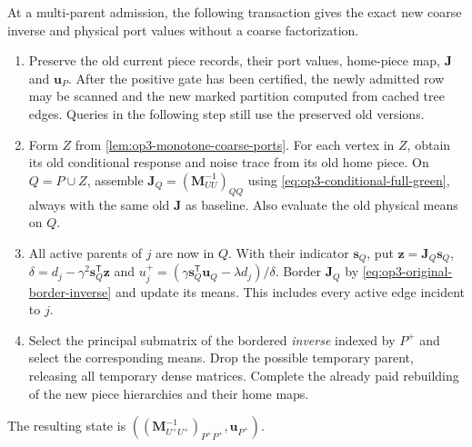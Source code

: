 \begin{lemma}
\label{lem:op3-cycle-inverse-transaction}
At a multi-parent admission, the following transaction gives the exact
new coarse inverse and physical port values without a coarse factorization.
\begin{enumerate}
 \item Preserve the old current piece records, their port values, home-piece
 map, $\boldsymbol J$ and $\boldsymbol u_P$. After the positive gate has
 been certified, the newly admitted row may be scanned and the new marked
 partition computed from cached tree edges. Queries in the following step
 still use the preserved old versions.
 \item Form $Z$ from \cref{lem:op3-monotone-coarse-ports}. For each vertex
 in $Z$, obtain its old conditional response and noise trace from its old
 home piece. On $Q=P\cup Z$, assemble
 $\boldsymbol J_Q=(\boldsymbol M_{UU}^{-1})_{QQ}$ using
 \eqref{eq:op3-conditional-full-green}, always with the same old
 $\boldsymbol J$ as baseline. Also evaluate the old physical means on $Q$.
 \item All active parents of $j$ are now in $Q$. With their indicator
 $\boldsymbol s_Q$, put
 $\boldsymbol z=\boldsymbol J_Q\boldsymbol s_Q$,
 $\delta=d_j-\gamma^2\boldsymbol s_Q^{\mathsf T}\boldsymbol z$ and
 $u_j^+=(\gamma\boldsymbol s_Q^{\mathsf T}\boldsymbol u_Q-
 \lambda d_j)/\delta$. Border $\boldsymbol J_Q$ by
 \eqref{eq:op3-original-border-inverse} and update its means. This includes
 every active edge incident to $j$.
 \item Select the principal submatrix of the bordered \emph{inverse}
 indexed by $P^+$ and select the corresponding means. Drop the possible
 temporary parent, releasing all temporary dense matrices. Complete the
 already paid rebuilding of the new piece hierarchies and their home maps.
\end{enumerate}
The resulting state is
$((\boldsymbol M_{U^+U^+}^{-1})_{P^+P^+},\boldsymbol u_{P^+})$.
\end{lemma}
